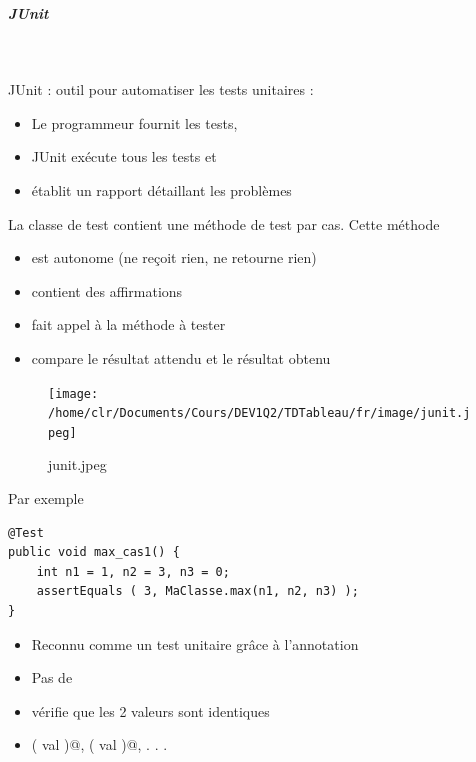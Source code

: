 \documentclass[11pt,a4paper]{article}
\begin{document}
            \par
        
			
		\subparagraph{JUnit} 
		
					\textcolor{white}{.} \par
				
          JUnit : outil pour automatiser les tests unitaires :
          
					\begin{itemize}
				
			\item Le programmeur fournit les tests,
			\item JUnit ex\'ecute tous les tests et
			\item \'etablit un rapport d\'etaillant les probl\`emes
					\end{itemize}
				
            \par
        
          La classe de test contient une m\'ethode de test par cas. Cette m\'ethode
          
					\begin{itemize}
				
			\item est autonome (ne re\c coit rien, ne retourne rien)
			\item contient des affirmations
			\item fait appel \`a la m\'ethode \`a tester
			\item compare le r\'esultat attendu et le r\'esultat obtenu
					\end{itemize}
				
            \par
        \begin{figure}[hbt]
				    \begin{center}
					\texttt{[image: /home/clr/Documents/Cours/DEV1Q2/TDTableau/fr/image/junit.jpeg]}
						\end{center}
                
                    \caption[junit.jpeg]{junit.jpeg}
                \end{figure}
                    
            \par
        Par exemple
            \par
        \begin{verbatim}
@Test
public void max_cas1() {
    int n1 = 1, n2 = 3, n3 = 0;
    assertEquals ( 3, MaClasse.max(n1, n2, n3) );
}
\end{verbatim}
					\begin{itemize}
				
			\item Reconnu comme un test unitaire gr\^ace \`a l'annotation \verb@@Test@
			\item Pas de \verb@static@
			\item \verb@assertEquals@ v\'erifie que les 2 valeurs sont identiques
			\item \verb@assertTrue ( val )@, \verb@assertFalse ( val )@, . . .
					\end{itemize}
				
\end{document}
